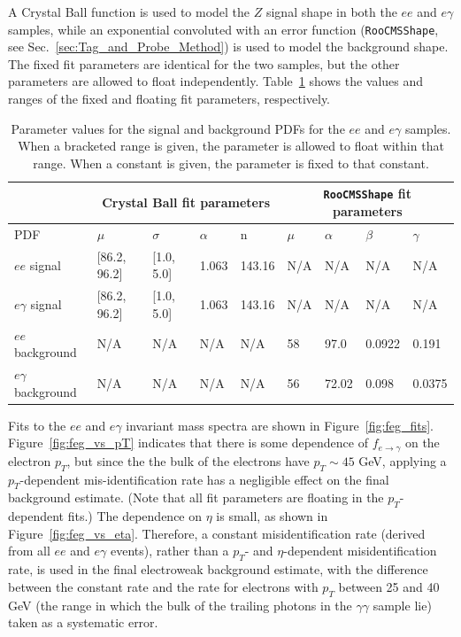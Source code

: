 \documentclass[dissertation.tex]{subfiles}
\begin{document}
A Crystal Ball function is used to model the $Z$ signal shape in both the $ee$ and $e\gamma$ samples, while an exponential convoluted with an error function (\verb+RooCMSShape+, see Sec.~\ref{sec:Tag_and_Probe_Method}) is used to model the background shape.  The fixed fit parameters are identical for the two samples, but the other parameters are allowed to float independently.  Table~\ref{tab:feg_fit_parameters} shows the values and ranges of the fixed and floating fit parameters, respectively.

\begin{table}[hcbp]
\caption{Parameter values for the signal and background PDFs for the $ee$ and $e\gamma$ samples.  When a bracketed range is given, the parameter is allowed to float within that range.  When a constant is given, the parameter is fixed to that constant.}
\centering
\begin{tabular}{|m{1.25cm}|m{1.25cm}|m{1.25cm}|m{1.25cm}|m{1.25cm}|m{1.25cm}|m{1.25cm}|m{1.25cm}|m{1.25cm}|}
\hline
& \multicolumn{4}{c|}{Crystal Ball fit parameters} & \multicolumn{4}{c|}{\texttt{RooCMSShape} fit parameters} \\
\hline
PDF & $\mu$ & $\sigma$ & $\alpha$ & n & $\mu$ & $\alpha$ & $\beta$ & $\gamma$ \\
\hline
$ee$ signal & [86.2, 96.2] & [1.0, 5.0] & 1.063 & 143.16 & N/A & N/A & N/A & N/A \\
\hline
$e\gamma$ signal & [86.2, 96.2] & [1.0, 5.0] & 1.063 & 143.16 & N/A & N/A & N/A & N/A \\
\hline
$ee$ background & N/A & N/A & N/A & N/A & 58 & 97.0 & 0.0922 & 0.191 \\
\hline
$e\gamma$ background & N/A & N/A & N/A & N/A & 56 & 72.02 & 0.098 & 0.0375 \\
\hline
\end{tabular}
\label{tab:feg_fit_parameters}
\end{table}

Fits to the $ee$ and $e\gamma$ invariant mass spectra are shown in Figure~\ref{fig:feg_fits}.  Figure~\ref{fig:feg_vs_pT} indicates that there is some dependence of $f_{e\rightarrow\gamma}$ on the electron $p_{T}$, but since the the bulk of the electrons have $p_{T}\sim45$ GeV, applying a $p_{T}$-dependent mis-identification rate has a negligible effect on the final background estimate.  (Note that all fit parameters are floating in the $p_{T}$-dependent fits.)  The dependence on $\eta$ is small, as shown in Figure~\ref{fig:feg_vs_eta}.  Therefore, a constant misidentification rate (derived from all $ee$ and $e\gamma$ events), rather than a $p_{T}$- and $\eta$-dependent misidentification rate, is used in the final electroweak background estimate, with the difference between the constant rate and the rate for electrons with $p_{T}$ between 25 and 40 GeV (the range in which the bulk of the trailing photons in the $\gamma\gamma$ sample lie) taken as a systematic error.
\end{document}
